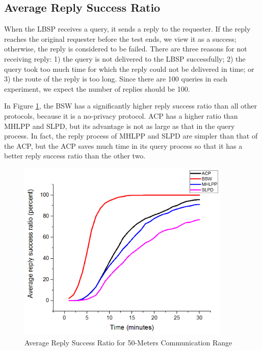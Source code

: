 \subsection{ Average Reply Success Ratio}

\noindent When the LBSP receives a query, it sends a reply to the requester. If the reply reaches the original requester before the test ends, we view it as a success; otherwise, the reply is considered to be failed. There are three reasons for not receiving reply: 1) the query is not delivered to the LBSP successfully; 2) the query took too much time for which the reply could not be delivered in time; or 3) the route of the reply is too long. Since there are 100 queries in each experiment, we expect the number of replies should be 100. 

In Figure \ref{fig:F417AverageReplySuccessRatioWith50MetersCommunicationRatio}, the BSW has a significantly higher reply success ratio than all other protocols, because it is a no-privacy protocol. ACP has a higher ratio than MHLPP and SLPD, but its advantage is not as large as that in the query process. In fact, the reply process of MHLPP and SLPD are simpler than that of the ACP, but the ACP saves much time in its query process so that it has a better reply success ratio than the other two.

\begin{figure} [hbtp]
  \centering 
  \includegraphics[width=4.0in]{figures/F417AverageReplySuccessRatioWith50MetersCommunicationRatio.png}
  \caption{Average Reply Success Ratio for 50-Meters Communication Range} 
  \label{fig:F417AverageReplySuccessRatioWith50MetersCommunicationRatio} %
\end{figure}

